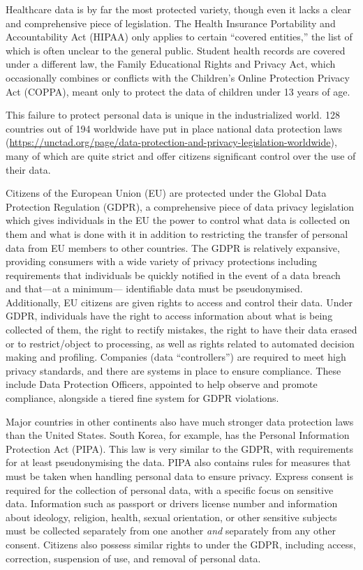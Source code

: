 \documentclass[water,article,submit,moreauthors,pdftex]{mdpi}
\begin{document}
Healthcare data is by far the most protected variety, though even it
lacks a clear and comprehensive piece of legislation. The Health
Insurance Portability and Accountability Act (HIPAA) only applies to
certain ``covered entities,'' the list of which is often unclear to the
general public. Student health records are covered under a different
law, the Family Educational Rights and Privacy Act, which occasionally
combines or conflicts with the Children's Online Protection Privacy Act
(COPPA), meant only to protect the data of children under 13 years of
age.

This failure to protect personal data is unique in the industrialized
world. 128 countries out of 194 worldwide have put in place national
data protection laws
(\url{https://unctad.org/page/data-protection-and-privacy-legislation-worldwide}),
many of which are quite strict and offer citizens significant control
over the use of their data.

Citizens of the European Union (EU) are protected under the Global Data
Protection Regulation (GDPR), a comprehensive piece of data privacy
legislation which gives individuals in the EU the power to control what
data is collected on them and what is done with it in addition to
restricting the transfer of personal data from EU members to other
countries. The GDPR is relatively expansive, providing consumers with a
wide variety of privacy protections including requirements that
individuals be quickly notified in the event of a data breach and
that---at a minimum--- identifiable data must be pseudonymised.
Additionally, EU citizens are given rights to access and control their
data. Under GDPR, individuals have the right to access information about
what is being collected of them, the right to rectify mistakes, the
right to have their data erased or to restrict/object to processing, as
well as rights related to automated decision making and profiling.
Companies (data ``controllers'') are required to meet high privacy
standards, and there are systems in place to ensure compliance. These
include Data Protection Officers, appointed to help observe and promote
compliance, alongside a tiered fine system for GDPR violations.

Major countries in other continents also have much stronger data
protection laws than the United States. South Korea, for example, has
the Personal Information Protection Act (PIPA). This law is very similar
to the GDPR, with requirements for at least pseudonymising the data.
PIPA also contains rules for measures that must be taken when handling
personal data to ensure privacy. Express consent is required for the
collection of personal data, with a specific focus on sensitive data.
Information such as passport or drivers license number and information
about ideology, religion, health, sexual orientation, or other sensitive
subjects must be collected separately from one another \emph{and}
separately from any other consent. Citizens also possess similar rights
to under the GDPR, including access, correction, suspension of use, and
removal of personal data.
\end{document}
